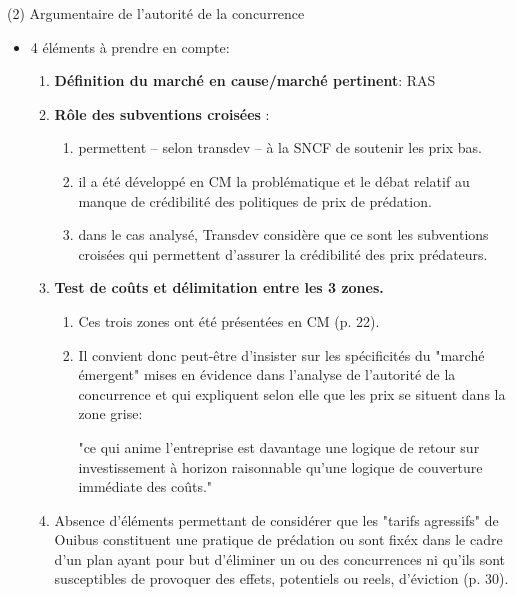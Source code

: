 \begin{frame}[allowframebreaks]{(2) Argumentaire de l'autorité de la concurrence}
\begin{itemize}
\item 4 éléments à prendre en compte: 
\begin{enumerate}
    \item \textbf{Définition du marché en cause/marché pertinent}: RAS
    \item \textbf{Rôle des subventions croisées} :
    \begin{enumerate}[$\star$]
        \item permettent – selon transdev – à la SNCF de soutenir les prix bas. 
        \item il a été développé en CM la problématique et le débat relatif au manque de crédibilité des politiques de prix de prédation.
        \item dans le cas analysé, Transdev considère que  ce sont les subventions croisées qui permettent d’assurer la crédibilité des prix prédateurs. 
    \end{enumerate}
    \item \textbf{Test de coûts et délimitation entre les 3 zones.}
    \begin{enumerate}[$\star$]
        \item Ces trois zones ont été présentées en CM (p. 22).
        \item Il convient donc peut-être d’insister sur les spécificités du "marché émergent"  
        mises en évidence dans l’analyse de l’autorité de la concurrence et qui expliquent 
        selon elle que les prix se situent dans la zone grise:

        \medskip

        "ce qui anime l’entreprise est davantage une logique de retour sur investissement
         à horizon raisonnable qu’une logique de couverture immédiate des coûts."
    \end{enumerate}
    \item Absence d’éléments permettant de considérer que les "tarifs agressifs" 
    de Ouibus constituent une pratique de prédation ou sont fixéx dans 
    le cadre d’un plan ayant pour but d’éliminer un ou des concurrences 
    ni qu’ils sont susceptibles de provoquer des effets, potentiels ou reels, d’éviction (p. 30).  
\end{enumerate}
\end{itemize}
\end{frame}

